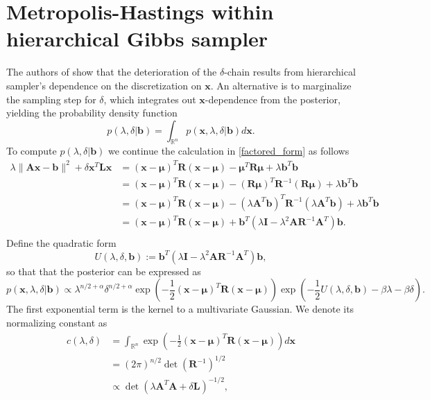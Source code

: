 \documentclass{article}
\newcommand{\RR}{{\mathbb R}}
\newcommand{\vect}[1]{\boldsymbol{#1}}
\begin{document}
\section{ Metropolis-Hastings within hierarchical Gibbs sampler }
The authors of \cite{agapiou2014analysis} show that the deterioration of the $\delta$-chain results from hierarchical sampler's dependence on the discretization on $\vect x$.   
An alternative is to marginalize the sampling step for $\delta$, which integrates out $\vect x$-dependence from the posterior, yielding the probability density function
$$
  p(\lambda,\delta|\vect b) = \int_{\RR^n} p(\vect x,\lambda,\delta|\vect b)d\vect x.
$$
To compute $p(\lambda,\delta|\vect b)$ we continue the calculation in \eqref{factored_form} as follows
\begin{align*}
  \lambda\|\vect{Ax} - \vect b\|^2 + \delta\vect x^T \vect L \vect x
  &= (\vect x-\vect \mu)^T\vect R(\vect x - \vect \mu) - \vect \mu^T\vect R\vect \mu + \lambda \vect b^T \vect b\\
  &= (\vect x-\vect \mu)^T\vect R(\vect x - \vect \mu) - (\vect R\vect \mu)^T\vect R^{-1}(\vect R\vect \mu) + \lambda \vect b^T \vect b\\
  &= (\vect x-\vect \mu)^T\vect R(\vect x - \vect \mu) - (\lambda \vect A^T \vect b)^T\vect R^{-1}(\lambda \vect A^T\vect b) + \lambda \vect b^T \vect b\\
  &= (\vect x-\vect \mu)^T\vect R(\vect x - \vect \mu) + \vect b^T( \lambda\vect I -  \lambda^2 \vect A\vect R^{-1}\vect A^T)\vect b.\\
\end{align*}
  Define the quadratic form
\begin{equation}
  U(\lambda,\delta,\vect b) := \vect b^T( \lambda\vect I -  \lambda^2 \vect A\vect R^{-1}\vect A^T)\vect b, \label{exp_term_r}
\end{equation}
so that that the posterior can be expressed as
\begin{equation*}
  p(\vect x,\lambda,\delta|\vect b) \propto \lambda^{n/2+\alpha}\delta^{n/2+\alpha}  \exp\left( -\frac 12(\vect x-\vect \mu)^T\vect R(\vect x - \vect \mu)\right) \exp\left(-\frac 12U(\lambda,\delta,\vect b)  -\beta\lambda - \beta \delta \right).
\end{equation*}
The first exponential term is the kernel to a multivariate Gaussian. We denote its normalizing constant as
\begin{align*}
  c(\lambda,\delta) 
  &= \int_{\RR^n} \exp\left(-\frac 12(\vect x-\vect \mu)^T\vect R(\vect x - \vect \mu)\right)d\vect x \\
  &= (2\pi)^{n/2} \det\left(\vect R^{-1}\right)^{1/2} \\
  &\propto \det(\lambda \vect A^T\vect A + \delta \vect L) ^{-1/2},
\end{align*}
\end{document}
